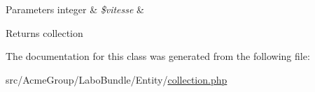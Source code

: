 \begin{DoxyParams}[1]{Parameters}
integer & {\em \$vitesse} & \\
\hline
\end{DoxyParams}
\begin{DoxyReturn}{Returns}
collection 
\end{DoxyReturn}


The documentation for this class was generated from the following file\+:\begin{DoxyCompactItemize}
\item 
src/\+Acme\+Group/\+Labo\+Bundle/\+Entity/\hyperlink{collection_8php}{collection.\+php}\end{DoxyCompactItemize}
